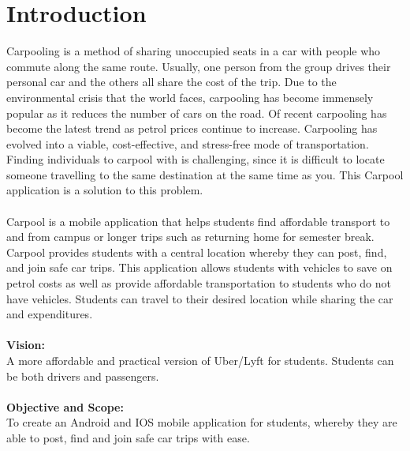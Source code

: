 \documentclass[hidelinks, 12pt, a4paper]{article}
\begin{document}
\section{Introduction}
Carpooling is a method of sharing unoccupied seats in a car with people who commute along the same route. Usually, one person from the group drives their personal car and the others all share the cost of the trip. Due to the environmental crisis that the world faces, carpooling has become immensely popular as it reduces the number of cars on the road. Of recent carpooling has become the latest trend as petrol prices continue to increase. Carpooling has evolved into a viable, cost-effective, and stress-free mode of transportation. Finding individuals to carpool with is challenging, since it is difficult to locate someone travelling to the same destination at the same time as you. This Carpool application is a solution to this problem. \\ \\
Carpool is a mobile application that helps students find affordable transport to and from campus or longer trips such as returning home for semester break. Carpool provides students with a central location whereby they can post, find, and join safe car trips. This application allows students with vehicles to save on petrol costs as well as provide affordable transportation to students who do not have vehicles. Students can travel to their desired location while sharing the car and expenditures.\\ \\
\textbf{Vision:}\\
A more affordable and practical version of Uber/Lyft for students. Students can be both drivers and passengers.\\ \\
\textbf{Objective and Scope:} \\
To create an Android and IOS mobile application for students, whereby they are able to post, find and join safe car trips with ease.
        
    
    

\end{document}
